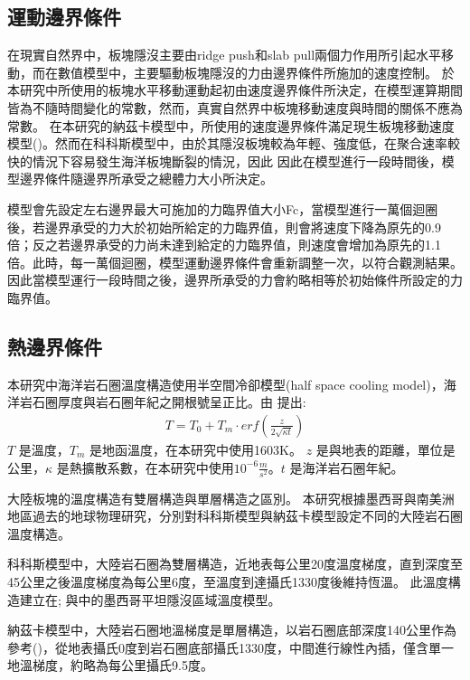 \subsection{運動邊界條件}
在現實自然界中，板塊隱沒主要由ridge push和slab pull兩個力作用所引起水平移動，而在數值模型中，主要驅動板塊隱沒的力由邊界條件所施加的速度控制。
於本研究中所使用的板塊水平移動運動起初由速度邊界條件所決定，在模型運算期間皆為不隨時間變化的常數，然而，真實自然界中板塊移動速度與時間的關係不應為常數。
在本研究的納茲卡模型中，所使用的速度邊界條件滿足現生板塊移動速度模型(\citealp{schellart2008global})。然而在科科斯模型中，由於其隱沒板塊較為年輕、強度低，在聚合速率較快的情況下容易發生海洋板塊斷裂的情況，因此
因此在模型進行一段時間後，模型邊界條件隨邊界所承受之總體力大小所決定。

模型會先設定左右邊界最大可施加的力臨界值大小Fc，當模型進行一萬個迴圈後，若邊界承受的力大於初始所給定的力臨界值，則會將速度下降為原先的0.9倍；反之若邊界承受的力尚未達到給定的力臨界值，則速度會增加為原先的1.1倍。此時，每一萬個迴圈，模型運動邊界條件會重新調整一次，以符合觀測結果。因此當模型運行一段時間之後，邊界所承受的力會約略相等於初始條件所設定的力臨界值。

\subsection{熱邊界條件}
本研究中海洋岩石圈溫度構造使用半空間冷卻模型(half space cooling model)，海洋岩石圈厚度與岩石圈年紀之開根號呈正比。由 \citealp{davis1974}提出:
\begin{align}
T=T_0+T_m\cdot {erf}(\frac{z}{2\sqrt{\kappa t}}) \label{eq:Half Space Model}
\end{align}
$T$ 是溫度，$T_m$ 是地函溫度，在本研究中使用1603K。
$z$ 是與地表的距離，單位是公里，$\kappa$ 是熱擴散系數，在本研究中使用$10^{-6} \frac{m}{s^2}$。$t$ 是海洋岩石圈年紀。

大陸板塊的溫度構造有雙層構造與單層構造之區別。
本研究根據墨西哥與南美洲地區過去的地球物理研究，分別對科科斯模型與納茲卡模型設定不同的大陸岩石圈溫度構造。

科科斯模型中，大陸岩石圈為雙層構造，近地表每公里20度溫度梯度，直到深度至45公里之後溫度梯度為每公里6度，至溫度到達攝氏1330度後維持恆溫。
此溫度構造建立在\citealp{Manea2005}; \citealp{Manea2011Thermal}與\citealp{Manea2011Curie}中的墨西哥平坦隱沒區域溫度模型。

納茲卡模型中，大陸岩石圈地溫梯度是單層構造，以岩石圈底部深度140公里作為參考(\citealp{perez2008})，從地表攝氏0度到岩石圈底部攝氏1330度，中間進行線性內插，僅含單一地溫梯度，約略為每公里攝氏9.5度。

